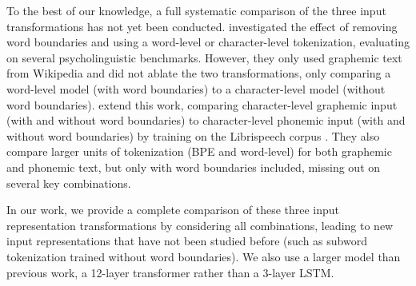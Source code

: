 To the best of our knowledge, a full systematic comparison of the three input transformations has not yet been conducted.  \citet{hahn-baroni-2019-tabula} investigated the effect of removing word boundaries and using a word-level or character-level tokenization, evaluating on several psycholinguistic benchmarks. However, they only used graphemic text from Wikipedia and did not ablate the two transformations, only comparing a word-level model (with word boundaries) to a character-level model (without word boundaries). \citet{nguyen-2022-word-boundaries} extend this work, comparing character-level graphemic input (with and without word boundaries) to character-level phonemic input (with and without word boundaries) by training on the Librispeech corpus \citep{panayotov2015librispeech}. They also compare larger units of tokenization (BPE and word-level) for both graphemic and phonemic text, but only with word boundaries included, missing out on several key combinations. 

In our work, we provide a complete comparison of these three input representation transformations by considering all combinations, leading to new input representations that have not been studied before (such as subword tokenization trained without word boundaries). We also use a larger model than previous work, a 12-layer transformer rather than a 3-layer LSTM.




